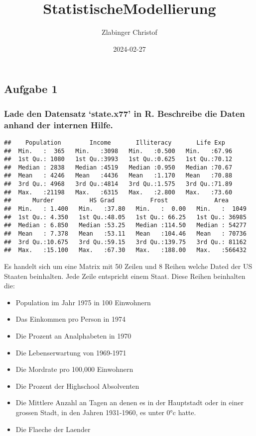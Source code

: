 \documentclass[
]{article}
\title{StatistischeModellierung}
\author{Zlabinger Christof}
\date{2024-02-27}
\providecommand{\tightlist}{%
  \setlength{\itemsep}{0pt}\setlength{\parskip}{0pt}}
\begin{document}
\maketitle

\subsection{Aufgabe 1}\label{aufgabe-1}

\subsubsection{Lade den Datensatz `state.x77' in R. Beschreibe die Daten
anhand der internen
Hilfe.}\label{lade-den-datensatz-state.x77-in-r.-beschreibe-die-daten-anhand-der-internen-hilfe.}

\begin{verbatim}
##    Population        Income       Illiteracy       Life Exp    
##  Min.   :  365   Min.   :3098   Min.   :0.500   Min.   :67.96  
##  1st Qu.: 1080   1st Qu.:3993   1st Qu.:0.625   1st Qu.:70.12  
##  Median : 2838   Median :4519   Median :0.950   Median :70.67  
##  Mean   : 4246   Mean   :4436   Mean   :1.170   Mean   :70.88  
##  3rd Qu.: 4968   3rd Qu.:4814   3rd Qu.:1.575   3rd Qu.:71.89  
##  Max.   :21198   Max.   :6315   Max.   :2.800   Max.   :73.60  
##      Murder          HS Grad          Frost             Area       
##  Min.   : 1.400   Min.   :37.80   Min.   :  0.00   Min.   :  1049  
##  1st Qu.: 4.350   1st Qu.:48.05   1st Qu.: 66.25   1st Qu.: 36985  
##  Median : 6.850   Median :53.25   Median :114.50   Median : 54277  
##  Mean   : 7.378   Mean   :53.11   Mean   :104.46   Mean   : 70736  
##  3rd Qu.:10.675   3rd Qu.:59.15   3rd Qu.:139.75   3rd Qu.: 81162  
##  Max.   :15.100   Max.   :67.30   Max.   :188.00   Max.   :566432
\end{verbatim}

Es handelt sich um eine Matrix mit 50 Zeilen und 8 Reihen welche Dated
der US Staaten beinhalten. Jede Zeile entspricht einem Staat. Diese
Reihen beinhalten die:

\begin{itemize}
\tightlist
\item
  Population im Jahr 1975 in 100 Einwohnern
\item
  Das Einkommen pro Person in 1974
\item
  Die Prozent an Analphabeten in 1970
\item
  Die Lebenserwartung von 1969-1971
\item
  Die Mordrate pro 100,000 Einwohnern
\item
  Die Prozent der Highschool Absolventen
\item
  Die Mittlere Anzahl an Tagen an denen es in der Hauptstadt oder in
  einer grossen Stadt, in den Jahren 1931-1960, es unter 0°c hatte.
\item
  Die Flaeche der Laender
\end{itemize}
\end{document}
